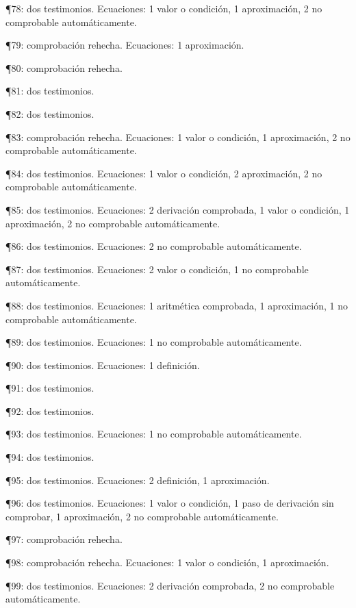\documentclass[10pt,openany]{book}
\begin{document}
\noindent ¶78: dos testimonios. Ecuaciones: 1 valor o condición, 1 aproximación, 2 no comprobable automáticamente.\par
\noindent ¶79: comprobación rehecha. Ecuaciones: 1 aproximación.\par
\noindent ¶80: comprobación rehecha.\par
\noindent ¶81: dos testimonios.\par
\noindent ¶82: dos testimonios.\par
\noindent ¶83: comprobación rehecha. Ecuaciones: 1 valor o condición, 1 aproximación, 2 no comprobable automáticamente.\par
\noindent ¶84: dos testimonios. Ecuaciones: 1 valor o condición, 2 aproximación, 2 no comprobable automáticamente.\par
\noindent ¶85: dos testimonios. Ecuaciones: 2 derivación comprobada, 1 valor o condición, 1 aproximación, 2 no comprobable automáticamente.\par
\noindent ¶86: dos testimonios. Ecuaciones: 2 no comprobable automáticamente.\par
\noindent ¶87: dos testimonios. Ecuaciones: 2 valor o condición, 1 no comprobable automáticamente.\par
\noindent ¶88: dos testimonios. Ecuaciones: 1 aritmética comprobada, 1 aproximación, 1 no comprobable automáticamente.\par
\noindent ¶89: dos testimonios. Ecuaciones: 1 no comprobable automáticamente.\par
\noindent ¶90: dos testimonios. Ecuaciones: 1 definición.\par
\noindent ¶91: dos testimonios.\par
\noindent ¶92: dos testimonios.\par
\noindent ¶93: dos testimonios. Ecuaciones: 1 no comprobable automáticamente.\par
\noindent ¶94: dos testimonios.\par
\noindent ¶95: dos testimonios. Ecuaciones: 2 definición, 1 aproximación.\par
\noindent ¶96: dos testimonios. Ecuaciones: 1 valor o condición, 1 paso de derivación sin comprobar, 1 aproximación, 2 no comprobable automáticamente.\par
\noindent ¶97: comprobación rehecha.\par
\noindent ¶98: comprobación rehecha. Ecuaciones: 1 valor o condición, 1 aproximación.\par
\noindent ¶99: dos testimonios. Ecuaciones: 2 derivación comprobada, 2 no comprobable automáticamente.\par
\end{document}
